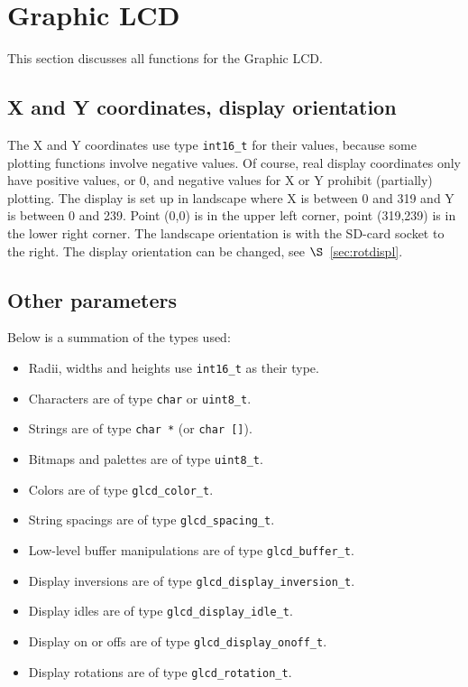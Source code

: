 \documentclass[12pt]{article}
\begin{document}
\section{Graphic LCD}
This section discusses all functions for the Graphic LCD.

\subsection{X and Y coordinates, display orientation}
The X and Y coordinates use type \lstinline|int16_t| for their values, because some plotting functions involve negative values. Of course, real display coordinates only have positive values, or 0, and negative values for X or Y prohibit (partially) plotting. The display is set up in landscape where X is between 0 and 319 and Y is between 0 and 239. Point (0,0) is in the upper left corner, point (319,239) is in the lower right corner. The landscape orientation is with the SD-card socket to the right.
The display orientation can be changed, see $\S$~\ref{sec:rotdispl}.

\subsection{Other parameters}
Below is a summation of the types used:

\begin{itemize}
\item Radii, widths and heights use \lstinline|int16_t| as their type.
\item Characters are of type \lstinline|char| or \lstinline|uint8_t|.
\item Strings are of type \lstinline|char *| (or \lstinline|char []|).
\item Bitmaps and palettes are of type \lstinline|uint8_t|.
\item Colors are of type \lstinline|glcd_color_t|.
\item String spacings are of type \lstinline|glcd_spacing_t|.
\item Low-level buffer manipulations are of type \lstinline|glcd_buffer_t|.
\item Display inversions are of type \lstinline|glcd_display_inversion_t|.
\item Display idles are of type \lstinline|glcd_display_idle_t|.
\item Display on or offs are of type \lstinline|glcd_display_onoff_t|.
\item Display rotations are of type \lstinline|glcd_rotation_t|.
\end{itemize}
\end{document}
